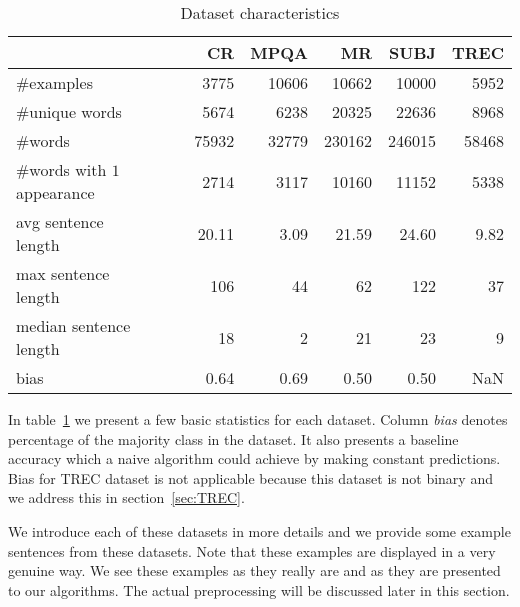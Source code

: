     \begin{table}[h]
    \begin{center}
    
    \begin{tabular}{l|rrrrr}
    \toprule
    {} &        CR &      MPQA &         MR &      SUBJ &      TREC \\\hline
    \midrule
    \#examples                                &   3775 &  10606 &   10662 &   10000 &   5952 \\\hline
    \#unique words                            &   5674 &   6238 &   20325 &   22636 &   8968 \\\hline
    \#words                                   &  75932 &  32779 &  230162 &  246015 &  58468 \\\hline
    \specialcell{\#words with\\$1$ appearance} &   2714 &   3117 &   10160 &   11152 &   5338 \\\hline
    \specialcell{avg sentence\\length}       &     20.11 &      3.09 &      21.59 &      24.60 &      9.82 \\\hline
    \specialcell{max sentence\\length}       &    106 &     44 &      62 &     122 &     37 \\\hline
    \specialcell{median sentence\\length}    &     18 &      2 &      21 &      23 &      9 \\\hline
    bias                                     &      0.64 &      0.69 &       0.50 &       0.50 &       NaN \\
    \bottomrule
    \end{tabular}
    
    \caption[Dataset characteristics]{Dataset characteristics}
    \label{tab:datasets:stats}
    \end{center}
    \end{table}


    In table~\ref{tab:datasets:stats} we present a few basic statistics for each dataset.
    Column \emph{bias} denotes percentage of the majority class in the dataset.
    It also presents a baseline accuracy which a naive algorithm could achieve by making constant predictions. 
    Bias for TREC dataset is not applicable because this dataset is not binary and we address this in section~\ref{sec:TREC}.
    
    We introduce each of these datasets in more details and we provide some example sentences from these datasets.
    Note that these examples are displayed in a very genuine way. 
    We see these examples as they really are and as they are presented to our algorithms.
    The actual preprocessing will be discussed later in this section.
    
